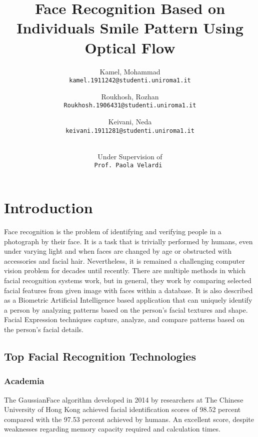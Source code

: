 \documentclass{article}
\begin{document}
\title{ Face Recognition Based on Individuals  Smile Pattern Using Optical Flow\\}
\author{
  Kamel, Mohammad\\
  \texttt{kamel.1911242@studenti.uniroma1.it}
  \and
  Roukhosh, Rozhan\\
  \texttt{Roukhosh.1906431@studenti.uniroma1.it}
  \and
Keivani, Neda\\
  \texttt{keivani.1911281@studenti.uniroma1.it}\\\\
  \and
Under Supervision of\\
  \texttt{Prof. Paola Velardi }
}
\maketitle




\section{Introduction}
\par{Face recognition is the problem of identifying and verifying people in a photograph by their face. It is a task that is trivially performed by humans, even under varying light and when faces are changed by age or obstructed with accessories and facial hair. Nevertheless, it is remained a challenging computer vision problem for decades until recently. There are multiple methods in which facial recognition systems work, but in general, they work by comparing selected facial features from given image with faces within a database. It is also described as a Biometric Artificial Intelligence based application that can uniquely identify a person by analyzing patterns based on the person's facial textures and shape. Facial Expression techniques capture, analyze, and compare patterns based on the person's facial details.
}
\subsection{Top Facial Recognition Technologies}
\subsubsection{Academia}
\par{The GaussianFace algorithm developed in 2014 by researchers at The Chinese University of Hong Kong achieved facial identification scores of 98.52 percent compared with the 97.53 percent achieved by humans. An excellent score, despite weaknesses regarding memory capacity required and calculation times.}
\end{document}
